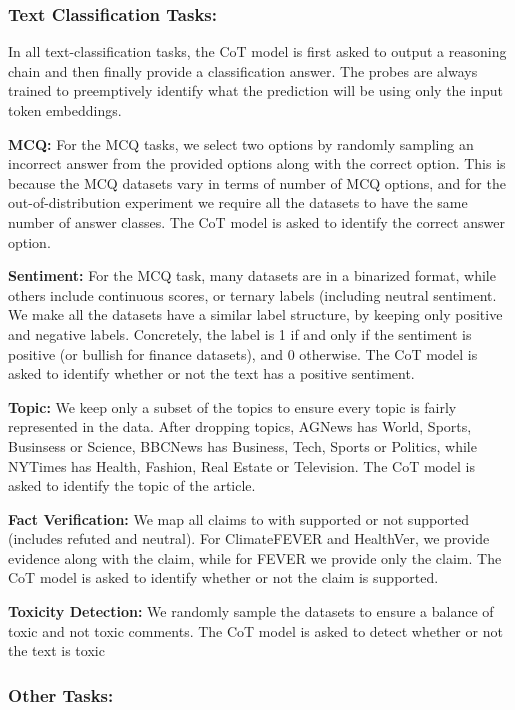 \subsubsection{Text Classification Tasks:}
In all text-classification tasks, the CoT model is first asked to output a reasoning chain and then finally provide a classification answer. The probes are always trained to preemptively identify what the prediction will be using only the input token embeddings. 

\noindent\textbf{MCQ:} For the MCQ tasks, we select two options by randomly sampling an incorrect answer from the provided options along with the correct option. This is because the MCQ datasets vary in terms of number of MCQ options, and for the out-of-distribution experiment we require all the datasets to have the same number of answer classes. The CoT model is asked to identify the correct answer option. 

\textbf{Sentiment:} For the MCQ task, many datasets are in a binarized format, while others include continuous scores, or ternary labels (including neutral sentiment. We make all the datasets have a similar label structure,  by keeping only positive and negative labels. Concretely, the label is 1 if and only if the sentiment is positive (or bullish for finance datasets), and 0 otherwise. The CoT model is asked to identify whether or not the text has a positive sentiment. 

\textbf{Topic:} We keep only a subset of the topics to ensure every topic is fairly represented in the data. After dropping topics, AGNews has World, Sports, Businsess or Science, BBCNews has Business, Tech, Sports or Politics, while NYTimes has Health, Fashion, Real Estate or Television. The CoT model is asked to identify the topic of the article.

\textbf{Fact Verification:} We map all claims to with supported or not supported (includes refuted and neutral). For ClimateFEVER and HealthVer, we provide evidence along with the claim, while for FEVER we provide only the claim. The CoT model is asked to identify whether or not the claim is supported. 

\textbf{Toxicity Detection:} We randomly sample the datasets to ensure a balance of toxic and not toxic comments. The CoT model is asked to detect whether or not the text is toxic

\subsubsection{Other Tasks:}

